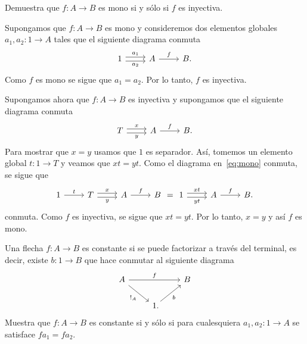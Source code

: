 \begin{exercise}[teca=1]
  Demuestra que \(f\colon A\to B\) es mono si y sólo si \(f\) es 
  inyectiva.
\end{exercise}
\begin{solution}
  Supongamos que \(f\colon A\to B\) es mono y consideremos dos elementos
  globales \(a_1,a_2\colon 1\to A\) tales que el siguiente diagrama conmuta
  \begin{equation*}
    \begin{tikzcd}[ampersand replacement=\&]
      1\ar[shift left]{r}{a_1}\ar[shift right]{r}[swap]{a_2}\& A\ar{r}{f}\& B.
    \end{tikzcd}
  \end{equation*}
  Como \(f\) es mono se sigue que \(a_1=a_2\). Por lo tanto, \(f\) es inyectiva.

  Supongamos ahora que \(f\colon A\to B\) es inyectiva y supongamos que el
  siguiente diagrama conmuta
  \begin{equation}\label{eq:mono}
    \begin{tikzcd}[ampersand replacement=\&]
      T\ar[shift left]{r}{x}\ar[shift right]{r}[swap]{y}\& A\ar{r}{f}\& B.
    \end{tikzcd}
  \end{equation}
  Para mostrar que \(x=y\) usamos que \(1\) es separador. Así, tomemos un
  elemento global \(t\colon 1\to T\) y veamos que \(xt=yt\). Como el diagrama
  en~\eqref{eq:mono} conmuta, se sigue que
  \begin{equation*}
    \begin{tikzcd}[ampersand replacement=\&]
      1\ar{r}{t} \& T\ar[shift left]{r}{x}\ar[shift right]{r}[swap]{y}\& A\ar{r}{f}\& B
    \end{tikzcd}
    =
    \begin{tikzcd}[ampersand replacement=\&]
      1\ar[shift left]{r}{xt}\ar[shift right]{r}[swap]{yt}\& A\ar{r}{f}\& B.
    \end{tikzcd}
  \end{equation*}
  conmuta. Como \(f\) es inyectiva, se sigue que \(xt=yt\). Por lo tanto,
  \(x=y\) y así \(f\) es mono.
\end{solution}

\begin{exercise}
  Una flecha \(f\colon A\to B\) es constante si se puede factorizar a
  través del terminal, es decir, existe \(b\colon 1\to B\) que hace
  conmutar al siguiente diagrama
  \begin{equation*}
      \begin{tikzcd}[ampersand replacement=\&] 
          A\ar{rr}{f}\ar{dr}[swap]{!_A} \&\& B\\
          \& 1\mathrlap{.}\ar{ur}[swap]{b}
      \end{tikzcd}
  \end{equation*}
  Muestra que \(f\colon A\to B\) es constante si y sólo si para
  cualesquiera \(a_1,a_2\colon 1\to A\) se satisface \(fa_1 = fa_2\).
\end{exercise}

